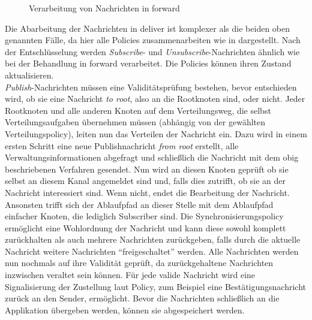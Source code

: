 \begin{figure}[htbp]
\centering
{}
\caption{Verarbeitung von Nachrichten in forward}
\label{fig:processing_forward}
\end{figure}

Die Abarbeitung der Nachrichten in deliver ist komplexer als die beiden oben genannten Fälle, da hier alle Policies zusammenarbeiten wie in  dargestellt. Nach der Entschlüsselung werden \emph{Subscribe}- und \emph{Unsubscribe}-Nachrichten ähnlich wie bei der Behandlung in forward verarbeitet. Die Policies können ihren Zustand aktualisieren.\\
\emph{Publish}-Nachrichten müssen eine Validitätsprüfung bestehen, bevor entschieden wird, ob sie eine Nachricht \emph{to root}, also an die Rootknoten sind, oder nicht. Jeder Rootknoten und alle anderen Knoten auf dem Verteilungsweg, die selbst Verteilungsaufgaben übernehmen müssen (abhängig von der gewählten Verteilungspolicy), leiten nun das Verteilen der Nachricht ein. Dazu wird in einem ersten Schritt eine neue Publishnachricht \emph{from root} erstellt, alle Verwaltungsinformationen abgefragt und schließlich die Nachricht mit dem obig beschriebenen Verfahren gesendet. Nun wird an diesen Knoten geprüft ob sie selbst an diesem Kanal angemeldet sind und, falls dies zutrifft, ob sie an der Nachricht interessiert sind. Wenn nicht, endet die Bearbeitung der Nachricht. Ansonsten trifft sich der Ablaufpfad an dieser Stelle mit dem Ablaufpfad einfacher Knoten, die lediglich Subscriber sind. Die Synchronisierungspolicy ermöglicht eine Wohlordnung der Nachricht und kann diese sowohl komplett zurückhalten als auch mehrere Nachrichten zurückgeben, falls durch die aktuelle Nachricht weitere Nachrichten \enquote{freigeschaltet} werden. Alle Nachrichten werden nun nochmals auf ihre Validität geprüft, da zurückgehaltene Nachrichten inzwischen veraltet sein können. Für jede valide Nachricht wird eine Signalisierung der Zustellung laut Policy, zum Beispiel eine Bestätigungsnachricht zurück an den Sender, ermöglicht. Bevor die Nachrichten schließlich an die Applikation übergeben werden, können sie abgespeichert werden.


